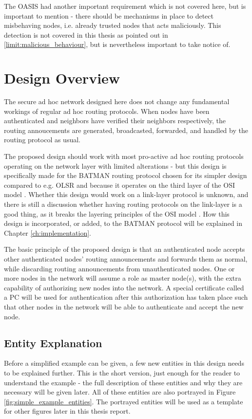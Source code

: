 The OASIS had another important requirement which is not covered here, but is
important to mention - there should be mechanisms in place to detect misbehaving
nodes, i.e. already trusted nodes that acts maliciously. This detection is not
covered in this thesis as pointed out in \ref{limit:malicious_behaviour}, but is
nevertheless important to take notice of.

\section{Design Overview}
The secure ad hoc network designed here does not change any fundamental workings
of regular ad hoc routing protocols. When nodes have been authenticated and
neighbors have verified their neighbors respectively, the routing annoucements
are generated, broadcasted, forwarded, and handled by the routing protocol as
usual.

The proposed design should work with most pro-active ad hoc routing protocols
operating on the network layer with limited alterations - but this design is
specifically made for the BATMAN \cite{batman_rfc} routing protocol chosen for
its simpler design compared to e.g. OLSR \cite{clausen2003rfc3626} and because
it operates on the third layer of the \ac{OSI} model \cite{zimmermann1980osi}.
Whether this design would work on a link-layer protocol is unknown, and there is
still a discussion whether having routing protocols on the link-layer is a good
thing, as it breaks the layering principles of the \ac{OSI} model
\cite{5680190}. How this design is incorporated, or added, to the BATMAN
protocol will be explained in Chapter \ref{ch:implementation}.

The basic principle of the proposed design is that an authenticated node accepts
other authenticated nodes' routing announcements and forwards them as normal, while
discarding routing announcements from unauthenticated nodes. One or more nodes in the
network will assume a role as master node(s), with the extra capability of
authorizing new nodes into the network. A special certificate called a \ac{PC}
\cite{rfc3820} will be used for authentication after this authorization has taken
place such that other nodes in the network will be able to authenticate and
accept the new node.

\subsection{Entity Explanation}
Before a simplified example can be given, a few new entities in this design
needs to be explained further. This is the short version, just enough for the
reader to understand the example - the full description of these entities
and why they are necessary will be given later. All of these entities are also
portrayed in Figure \ref{fig:simple_example_entities}. The portrayed entities
will be used as a template for other figures later in this thesis report.

